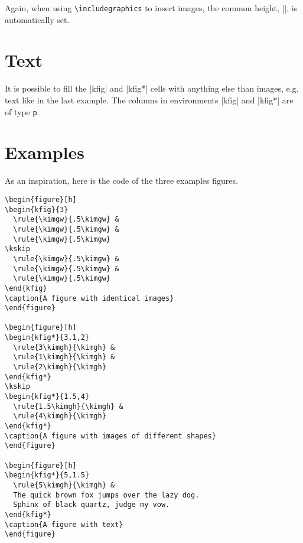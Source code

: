 \documentclass[12pt,a4paper]{article}
\begin{document}
Again, when using \verb|\includegraphics| to insert images, the common height, {\emphverb|\kimgh|}, is automatically set.



\section{Text}

It is possible to fill the {\emphverb|kfig|} and {\emphverb|kfig*|} cells with anything else than images, e.g. text like in the last example.
The columns in environments {\emphverb|kfig|} and {\emphverb|kfig*|} are of type \verb|p|.


\section{Examples}

As an inspiration, here is the code of the three examples figures.

\begin{verbatim}
\begin{figure}[h]
\begin{kfig}{3}
  \rule{\kimgw}{.5\kimgw} &
  \rule{\kimgw}{.5\kimgw} &
  \rule{\kimgw}{.5\kimgw}
\kskip
  \rule{\kimgw}{.5\kimgw} &
  \rule{\kimgw}{.5\kimgw} &
  \rule{\kimgw}{.5\kimgw}
\end{kfig}
\caption{A figure with identical images}
\end{figure}

\begin{figure}[h]
\begin{kfig*}{3,1,2}
  \rule{3\kimgh}{\kimgh} &
  \rule{1\kimgh}{\kimgh} &
  \rule{2\kimgh}{\kimgh}
\end{kfig*}
\kskip
\begin{kfig*}{1.5,4}
  \rule{1.5\kimgh}{\kimgh} &
  \rule{4\kimgh}{\kimgh}
\end{kfig*}
\caption{A figure with images of different shapes}
\end{figure}

\begin{figure}[h]
\begin{kfig*}{5,1.5}
  \rule{5\kimgh}{\kimgh} &
  The quick brown fox jumps over the lazy dog.
  Sphinx of black quartz, judge my vow.
\end{kfig*}
\caption{A figure with text}
\end{figure}
\end{verbatim}
\end{document}
